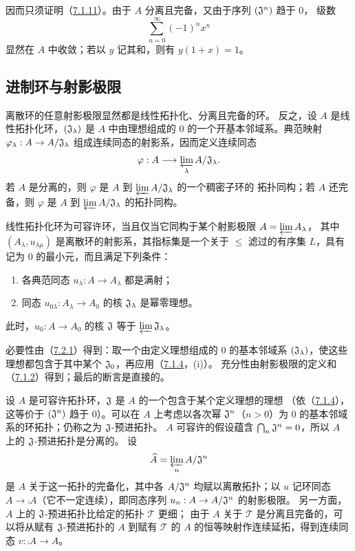 因而只须证明（\hyperlink{para:0:7.1.11}{7.1.11}）。由于 $A$ 分离且完备，又由于序列 $(\mathfrak J^n)$ 趋于 $0$，
级数
\[
 \sum_{n=0}^{\infty}(-1)^n x^n
\]
显然在 $A$ 中收敛；若以 $y$ 记其和，则有 $y(1+x)=1$。



\par

\subsection{进制环与射影极限}\hypertarget{heading:0:7.2}{}

离散环的任意射影极限显然都是线性拓扑化、分离且完备的环。
反之，设 $A$ 是线性拓扑化环，$(\mathfrak J_\lambda)$ 是 $A$ 中由理想组成的
$0$ 的一个开基本邻域系。典范映射 $\varphi_\lambda:A\to A/\mathfrak J_\lambda$
组成连续同态的射影系，因而定义连续同态
\[
 \varphi:A\longrightarrow\varprojlim_\lambda A/\mathfrak J_\lambda.
\]
若 $A$ 是分离的，则 $\varphi$ 是 $A$ 到 $\varprojlim A/\mathfrak J_\lambda$ 的一个稠密子环的
拓扑同构；若 $A$ 还完备，则 $\varphi$ 是 $A$ 到 $\varprojlim A/\mathfrak J_\lambda$ 的拓扑同构。

线性拓扑化环为可容许环，当且仅当它同构于某个射影极限 $A=\varprojlim A_\lambda$，
其中 $(A_\lambda,u_{\lambda\mu})$ 是离散环的射影系，其指标集是一个关于 $\leq$
滤过的有序集 $L$，具有记为 $0$ 的最小元，而且满足下列条件：
\begin{enumerate}[label=\arabic*°]
\item 各典范同态 $u_\lambda:A\to A_\lambda$ 都是满射；
\item 同态 $u_{0\lambda}:A_\lambda\to A_0$ 的核 $\mathfrak J_\lambda$ 是幂零理想。
\end{enumerate}
此时，$u_0:A\to A_0$ 的核 $\mathfrak J$ 等于 $\varprojlim\mathfrak J_\lambda$。

必要性由（\hyperlink{para:0:7.2.1}{7.2.1}）得到：取一个由定义理想组成的 $0$ 的基本邻域系
$(\mathfrak J_\lambda)$，使这些理想都包含于其中某个 $\mathfrak J_0$，再应用（\hyperlink{para:0:7.1.4}{7.1.4}，(i)）。
充分性由射影极限的定义和（\hyperlink{para:0:7.1.2}{7.1.2}）得到；最后的断言是直接的。

设 $A$ 是可容许拓扑环，$\mathfrak J$ 是 $A$ 的一个包含于某个定义理想的理想
（依（\hyperlink{para:0:7.1.4}{7.1.4}），这等价于 $(\mathfrak J^n)$ 趋于 $0$）。可以在 $A$ 上考虑以各次幂
$\mathfrak J^n$（$n>0$）为 $0$ 的基本邻域系的环拓扑；仍称之为 $\mathfrak J$-预进拓扑。
$A$ 可容许的假设蕴含 $\bigcap_n\mathfrak J^n=0$，所以 $A$ 上的 $\mathfrak J$-预进拓扑是分离的。
设
\[
 \widehat{A}=\varprojlim_n A/\mathfrak J^n
\]
是 $A$ 关于这一拓扑的完备化，其中各 $A/\mathfrak J^n$ 均赋以离散拓扑；以 $u$ 记环同态
$A\to\comp A$（它不一定连续），即同态序列 $u_n:A\to A/\mathfrak J^n$ 的射影极限。
另一方面，$A$ 上的 $\mathfrak J$-预进拓扑比给定的拓扑 $\mathscr T$ 更细；
由于 $A$ 关于 $\mathscr T$ 是分离且完备的，可以将从赋有 $\mathfrak J$-预进拓扑的 $A$
到赋有 $\mathscr T$ 的 $A$ 的恒等映射作连续延拓，得到连续同态
$v:\comp A\to A$。

